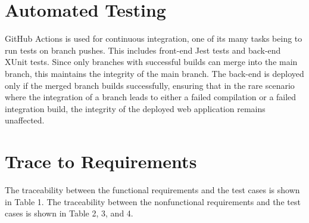\documentclass[12pt, titlepage]{article}
\begin{document}
\section{Automated Testing}

GitHub Actions is used for continuous integration, one of its many tasks being to run tests on branch pushes. This includes front-end Jest tests and back-end XUnit tests. Since only branches with successful builds can merge into the main branch, this maintains the integrity of the main branch. The back-end is deployed only if the merged branch builds successfully, ensuring that in the rare scenario where the integration of a branch leads to either a failed compilation or a failed integration build, the integrity of the deployed web application remains unaffected.
		
\section{Trace to Requirements}
The traceability between the functional requirements and the test cases is shown in Table 1. The traceability between the nonfunctional requirements and the test cases is shown in Table 2, 3, and 4. 
\end{document}
